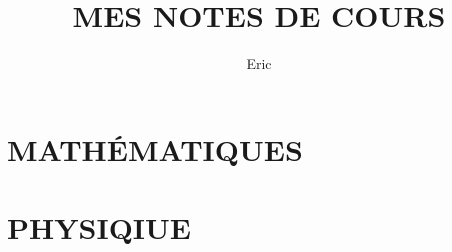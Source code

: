\documentclass[openany]{book}
\begin{document}
\title{MES NOTES DE COURS}
\author{Eric}
\maketitle
\tableofcontents
\frontmatter



\part{MATH\'EMATIQUES}





\part{PHYSIQIUE}





\end{document}
